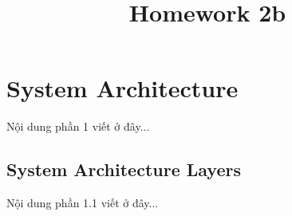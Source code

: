 \documentclass[oneside,final]{hcmut-report}
\title{Homework 2b}
\begin{document}
\coverpage

\newpage
\tableofcontents
\newpage

\section{System Architecture}
Nội dung phần 1 viết ở đây...

\subsection{System Architecture Layers}
Nội dung phần 1.1 viết ở đây...
\end{document}
